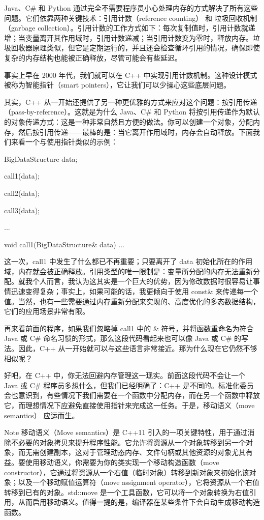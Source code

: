 Java、C\# 和 Python 通过完全不需要程序员小心处理内存的方式解决了所有这些问题。它们依靠两种关键技术：引用计数（reference counting） 和 垃圾回收机制（garbage collection）。引用计数的工作方式如下：每次复制值时，引用计数就递增；当变量离开其作用域时，引用计数递减；当引用计数变为零时，释放内存。垃圾回收器原理类似，但它是定期运行的，并且还会检查循环引用的情况，确保即使复杂的内存结构也能被正确释放，尽管可能会有些延迟。

事实上早在 2000 年代，我们就可以在 C++ 中实现引用计数机制。这种设计模式被称为智能指针（smart pointers），它让我们可以少操心这些底层问题。

其实，C++ 从一开始还提供了另一种更优雅的方式来应对这个问题：按引用传递（pass-by-reference）。这就是为什么 Java、C\# 和 Python 将按引用传递作为默认的对象传递方式：这是一种非常自然且方便的做法。你可以创建一个对象，分配内存，然后按引用传递——最棒的是：当它离开作用域时，内存会自动释放。下面我们来看一个与使用指针类似的示例：


\begin{cpp}
BigDataStructure data{};

call1(data);

call2(data);

call3(data);

...

void call1(BigDataStructure& data){
  ...
}
\end{cpp}

这一次，call1 中发生了什么都已不再重要；只要离开了 data 初始化所在的作用域，内存就会被正确释放。引用类型的唯一限制是：变量所分配的内存无法重新分配。就我个人而言，我认为这其实是一个巨大的优势，因为修改数据时很容易让事情迅速变得复杂；事实上，如果可能的话，我更倾向于使用 const\& 来传递每一个值。当然，也有一些需要通过内存重新分配来实现的、高度优化的多态数据结构，它们的应用场景非常有限。

再来看前面的程序，如果我们忽略掉 call1 中的 \& 符号，并将函数重命名为符合 Java 或 C\# 命名习惯的形式，那么这段代码看起来也可以像 Java 或 C\# 的写法。因此，C++ 从一开始就可以与这些语言非常接近。那为什么现在它仍然不够相似呢？

好吧，在 C++ 中，你无法回避内存管理这一现实。前面这段代码不会让一个 Java 或 C\# 程序员多想什么，但我们已经明确了：C++ 是不同的。标准化委员会也意识到，有些情况下我们需要在一个函数中分配内存，而在另一个函数中释放它，而理想情况下应避免直接使用指针来完成这一任务。于是，移动语义（move semantics） 应运而生。

\begin{myNotic}{Note}
移动语义（Move semantics）是 C++11 引入的一项关键特性，用于通过消除不必要的对象拷贝来提升程序性能。它允许将资源从一个对象转移到另一个对象，而无需创建副本，这对于管理动态内存、文件句柄或其他资源的对象尤其有益。要使用移动语义，你需要为你的类实现一个移动构造函数（move constructor），它通过将资源从一个右值（临时对象）转移到新对象来初始化该对象；以及一个移动赋值运算符（move assignment operator），它将资源从一个右值转移到已有的对象。std::move 是一个工具函数，它可以将一个对象转换为右值引用，从而启用移动语义。值得一提的是，编译器在某些条件下会自动生成移动构造函数。
\end{myNotic}

